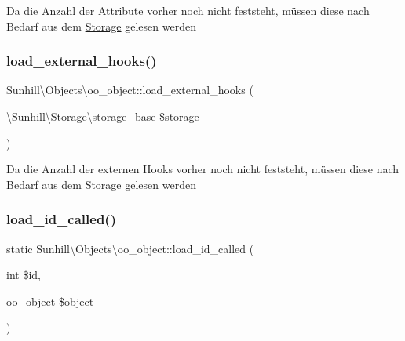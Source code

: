 Da die Anzahl der Attribute vorher noch nicht feststeht, müssen diese nach Bedarf aus dem \hyperlink{namespaceSunhill_1_1Storage}{Storage} gelesen werden \mbox{\label{classSunhill_1_1Objects_1_1oo__object_afa18a406cd6b553e994cb77c7be8b38c}} 
\subsubsection{\texorpdfstring{load\+\_\+external\+\_\+hooks()}{load\_external\_hooks()}}
{\footnotesize\ttfamily Sunhill\textbackslash{}\+Objects\textbackslash{}oo\+\_\+object\+::load\+\_\+external\+\_\+hooks (\begin{DoxyParamCaption}\item[{\textbackslash{}\hyperlink{classSunhill_1_1Storage_1_1storage__base}{Sunhill\textbackslash{}\+Storage\textbackslash{}storage\+\_\+base}}]{\$storage }\end{DoxyParamCaption})\hspace{0.3cm}{\ttfamily [protected]}}

Da die Anzahl der externen Hooks vorher noch nicht feststeht, müssen diese nach Bedarf aus dem \hyperlink{namespaceSunhill_1_1Storage}{Storage} gelesen werden \mbox{\label{classSunhill_1_1Objects_1_1oo__object_a292423c979677f33e722fc4ca5ed3195}} 
\subsubsection{\texorpdfstring{load\+\_\+id\+\_\+called()}{load\_id\_called()}}
{\footnotesize\ttfamily static Sunhill\textbackslash{}\+Objects\textbackslash{}oo\+\_\+object\+::load\+\_\+id\+\_\+called (\begin{DoxyParamCaption}\item[{int}]{\$id,  }\item[{\hyperlink{classSunhill_1_1Objects_1_1oo__object}{oo\+\_\+object}}]{\$object }\end{DoxyParamCaption})\hspace{0.3cm}{\ttfamily [static]}}

